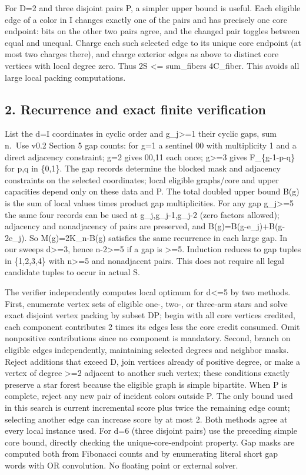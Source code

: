 \documentclass[
  10pt,
]{article}
\begin{document}
For D=2 and three disjoint pairs P, a simpler upper bound is useful.
Each eligible edge of a color in I changes exactly one of the pairs and
has precisely one core endpoint: bits on the other two pairs agree, and
the changed pair toggles between equal and unequal. Charge each such
selected edge to its unique core endpoint (at most two charges there),
and charge exterior edges as above to distinct core vertices with local
degree zero. Thus 2\textbar S\textbar{} \textless= sum\_fibers
4\textbar C\_fiber\textbar. This avoids all large local packing
computations.

\subsection{2. Recurrence and exact finite
verification}\label{recurrence-and-exact-finite-verification}

List the d=\textbar I\textbar{} coordinates in cyclic order and
g\_j\textgreater=1 their cyclic gaps, sum n.~Use v0.2 Section 5 gap
counts: for g=1 a sentinel 00 with multiplicity 1 and a direct adjacency
constraint; g=2 gives 00,11 each once; g\textgreater=3 gives
F\_\{g-1-p-q\} for p,q in \{0,1\}. The gap records determine the blocked
mask and adjacency constraints on the selected coordinates; local
eligible graphs/core and upper capacities depend only on these data and
P. The total doubled upper bound B(g) is the sum of local values times
product gap multiplicities. For any gap g\_j\textgreater=5 the same four
records can be used at g\_j,g\_j-1,g\_j-2 (zero factors allowed);
adjacency and nonadjacency of pairs are preserved, and
B(g)=B(g-e\_j)+B(g-2e\_j). So M(g)=2K\_n-B(g) satisfies the same
recurrence in each large gap. In our sweeps d\textgreater=3, hence
n-2\textgreater=5 if a gap is \textgreater=5. Induction reduces to gap
tuples in \{1,2,3,4\} with n\textgreater=5 and nonadjacent pairs. This
does not require all legal candidate tuples to occur in actual S.

The verifier independently computes local optimum for d\textless=5 by
two methods. First, enumerate vertex sets of eligible one-, two-, or
three-arm stars and solve exact disjoint vertex packing by subset DP;
begin with all core vertices credited, each component contributes 2
times its edges less the core credit consumed. Omit nonpositive
contributions since no component is mandatory. Second, branch on
eligible edges independently, maintaining selected degrees and neighbor
masks. Reject additions that exceed D, join vertices already of positive
degree, or make a vertex of degree \textgreater=2 adjacent to another
such vertex; these conditions exactly preserve a star forest because the
eligible graph is simple bipartite. When P is complete, reject any new
pair of incident colors outside P. The only bound used in this search is
current incremental score plus twice the remaining edge count; selecting
another edge can increase score by at most 2. Both methods agree at
every local instance used. For d=6 (three disjoint pairs) use the
preceding simple core bound, directly checking the unique-core-endpoint
property. Gap masks are computed both from Fibonacci counts and by
enumerating literal short gap words with OR convolution. No floating
point or external solver.
\end{document}

